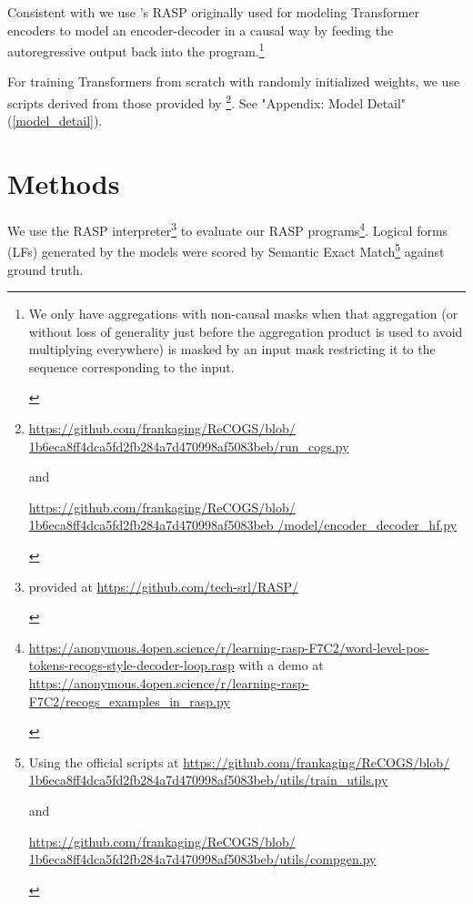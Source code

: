 \documentclass[11pt]{article}
\begin{document}
Consistent with \cite{Zhou2024} we use \cite{Weiss2021}'s RASP originally used for modeling Transformer encoders to model an encoder-decoder in a causal way by feeding the autoregressive output back into the program.\footnote{\begin{footnotesize}We only have aggregations with non-causal masks when that aggregation (or without loss of generality just before the aggregation product is used to avoid multiplying everywhere) is masked by an input mask restricting it to the sequence corresponding to the input.\end{footnotesize}}

For training Transformers from scratch with randomly initialized weights, we use scripts derived from those provided by \cite{Wu2023}\footnote{
\begin{footnotesize}\href{https://github.com/frankaging/ReCOGS/blob/1b6eca8ff4dca5fd2fb284a7d470998af5083beb/run\_cogs.py}{https://github.com/frankaging/ReCOGS/blob/
1b6eca8ff4dca5fd2fb284a7d470998af5083beb/run\_cogs.py}

and

\href{https://github.com/frankaging/ReCOGS/blob/1b6eca8ff4dca5fd2fb284a7d470998af5083beb/model/encoder\_decoder\_hf.py}{https://github.com/frankaging/ReCOGS/blob/
1b6eca8ff4dca5fd2fb284a7d470998af5083beb
/model/encoder\_decoder\_hf.py} 
\end{footnotesize}
}. See "Appendix: Model Detail" (\ref{model_detail}).
\section{Methods}
We use the RASP \cite{Weiss2021} interpreter\footnote{\begin{footnotesize}provided at \href{https://github.com/tech-srl/RASP/}{https://github.com/tech-srl/RASP/}
\end{footnotesize}
} to evaluate our RASP programs\footnote{\begin{footnotesize}\href{https://anonymous.4open.science/r/learning-rasp-F7C2/word-level-pos-tokens-recogs-style-decoder-loop.rasp}{https://anonymous.4open.science/r/learning-rasp-F7C2/word-level-pos-tokens-recogs-style-decoder-loop.rasp} with a demo at \href{https://anonymous.4open.science/r/learning-rasp-F7C2/recogs\_examples\_in\_rasp.py}{https://anonymous.4open.science/r/learning-rasp-F7C2/recogs\_examples\_in\_rasp.py}
\end{footnotesize}
}. Logical forms (LFs) generated by the models were scored by Semantic Exact Match\footnote{\begin{footnotesize}Using the official scripts at \href{https://github.com/frankaging/ReCOGS/blob/1b6eca8ff4dca5fd2fb284a7d470998af5083beb/utils/train\_utils.py}{https://github.com/frankaging/ReCOGS/blob/
1b6eca8ff4dca5fd2fb284a7d470998af5083beb/utils/train\_utils.py}

and

\href{https://github.com/frankaging/ReCOGS/blob/1b6eca8ff4dca5fd2fb284a7d470998af5083beb/utils/compgen.py}{https://github.com/frankaging/ReCOGS/blob/
1b6eca8ff4dca5fd2fb284a7d470998af5083beb/utils/compgen.py}
\end{footnotesize}
} against ground truth.
\end{document}
